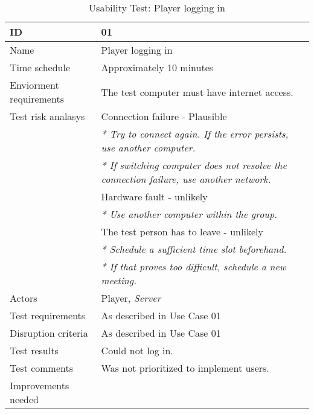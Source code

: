 
{\footnotesize
\begin{table}[H]
\begin{tabular}{| p{5cm} | p{10cm} |}\hline
	\textbf{ID}	& \textbf{01} \\ \hline
	Name		& Player logging in\\ \hline
	Time schedule	& Approximately 10 minutes\\ \hline
	Enviorment requirements 
		& The test computer must have internet access. \\ \hline
	Test risk analasys 
		& Connection failure - Plausible \\
		& \emph{* Try to connect again. If the error persists, use another computer.} \\
		& \emph{* If switching computer does not resolve the connection failure, use another network.}\\
		& Hardware fault - unlikely \\
		& \emph{* Use another computer within the group.} \\
		& The test person has to leave - unlikely \\
		& \emph{* Schedule a sufficient time slot beforehand.} \\
		& \emph{* If that proves too difficult, schedule a new meeting.}\\ \hline
	Actors	& Player, \emph{Server}\\ \hline
	Test requirements & As described in Use Case 01 \\ \hline
	Disruption criteria & As described in Use Case 01  \\ \hline
	Test results & Could not log in.
		& \\ \hline
	Test comments & Was not prioritized to implement users.
		& \\ \hline
	Improvements needed
		& \\ \hline
\end{tabular}


\caption{Usability Test: Player logging in}
\label{fig:usability_test_1}
\end{table}}


